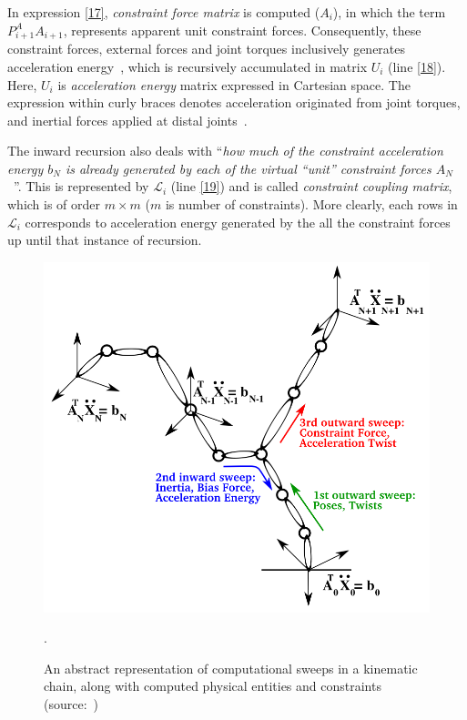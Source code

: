 In expression \ref{17}, \textit{constraint force matrix} is computed ($A_i$), in which the term $P_{i+1}^A A_{i+1}$, represents apparent unit constraint forces. Consequently, these constraint forces, external forces and joint torques inclusively generates acceleration energy~\cite{shakhimardanov2015composable}, which is recursively accumulated in matrix $U_i$ (line \ref{18}). Here, $U_i$ is \textit{acceleration energy} matrix expressed in Cartesian space. The expression within curly braces denotes acceleration originated from joint torques, and inertial forces applied at distal joints~\cite{shakhimardanov2015composable}.

The inward recursion also deals with ``\textit{how much of the constraint acceleration energy $b_N$ is already generated by each of the virtual ``unit'' constraint forces $A_N$}~\cite{shakhimardanov2015composable}''. This is represented by $\mathcal{L}_i$ (line \ref{19}) and is called \textit{constraint coupling matrix}, which is of order $m \times m$ ($m$ is number of constraints). More clearly, each rows in $\mathcal{L}_i$ corresponds to acceleration energy generated by the all the constraint forces up until that instance of recursion.

\begin{figure}[h!]
	\label{fig:sweep}
	\centering
	\includegraphics[scale=0.3]{images/sweep.png}
	\caption{An abstract representation of computational sweeps in a kinematic chain, along with computed physical entities and constraints (source:~\cite{shakhimardanov2015composable})}.	
\end{figure}

